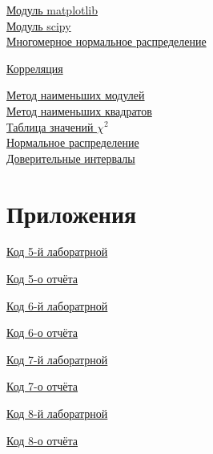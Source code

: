 \documentclass[a4]{article}
\begin{document}
	\href{https://matplotlib.org/}{Модуль matplotlib}\\
	
	\href{https://www.scipy.org/}{Модуль scipy}\\
	
	
	\href{https://ru.wikipedia.org/wiki/%D0%9C%D0%BD%D0%BE%D0%B3%D0%BE%D0%BC%D0%B5%D1%80%D0%BD%D0%BE%D0%B5_%D0%BD%D0%BE%D1%80%D0%BC%D0%B0%D0%BB%D1%8C%D0%BD%D0%BE%D0%B5_%D1%80%D0%B0%D1%81%D0%BF%D1%80%D0%B5%D0%B4%D0%B5%D0%BB%D0%B5%D0%BD%D0%B8%D0%B5}{Многомерное нормальное распределение}
	
	\href{https://ru.wikipedia.org/wiki/%D0%9A%D0%BE%D1%80%D1%80%D0%B5%D0%BB%D1%8F%D1%86%D0%B8%D1%8F}{Корреляция}
	
	\href{https://ru.wikipedia.org/wiki/%D0%9C%D0%B5%D1%82%D0%BE%D0%B4_%D0%BD%D0%B0%D0%B8%D0%BC%D0%B5%D0%BD%D1%8C%D1%88%D0%B8%D1%85_%D0%BC%D0%BE%D0%B4%D1%83%D0%BB%D0%B5%D0%B9}{Метод наименьших модулей}\\
		
	\href{https://ru.wikipedia.org/wiki/%D0%9C%D0%B5%D1%82%D0%BE%D0%B4_%D0%BD%D0%B0%D0%B8%D0%BC%D0%B5%D0%BD%D1%8C%D1%88%D0%B8%D1%85_%D0%BA%D0%B2%D0%B0%D0%B4%D1%80%D0%B0%D1%82%D0%BE%D0%B2}{Метод наименьших квадратов}\\
	
	\href{https://ru.wikipedia.org/wiki/%D0%9A%D0%B2%D0%B0%D0%BD%D1%82%D0%B8%D0%BB%D0%B8_%D1%80%D0%B0%D1%81%D0%BF%D1%80%D0%B5%D0%B4%D0%B5%D0%BB%D0%B5%D0%BD%D0%B8%D1%8F_%D1%85%D0%B8-%D0%BA%D0%B2%D0%B0%D0%B4%D1%80%D0%B0%D1%82}{Таблица значений $\chi^2$}\\
		
	\href{https://ru.wikipedia.org/wiki/%D0%9D%D0%BE%D1%80%D0%BC%D0%B0%D0%BB%D1%8C%D0%BD%D0%BE%D0%B5_%D1%80%D0%B0%D1%81%D0%BF%D1%80%D0%B5%D0%B4%D0%B5%D0%BB%D0%B5%D0%BD%D0%B8%D0%B5}{Нормальное распределение}\\
		
	\href{http://mit.spbau.ru/sewiki/images/a/a1/Cis.pdf}{Доверительные интервалы}\\
	
	\section{Приложения}
	
	\href{https://github.com/LuciusGen/Matstat/blob/master/Lab5/Lab5.py}{Код 5-й лаборатрной}
	
	\href{https://github.com/LuciusGen/Matstat/blob/master/Lab5/lab5.tex}{Код 5-о отчёта}
	
	\href{https://github.com/LuciusGen/Matstat/blob/master/Lab6/Lab6.py}{Код 6-й лаборатрной}
	
	\href{https://github.com/LuciusGen/Matstat/blob/master/Lab6/lab6.tex}{Код 6-о отчёта}
	
	\href{https://github.com/LuciusGen/Matstat/blob/master/Lab6/Lab7.py}{Код 7-й лаборатрной}
	
	\href{https://github.com/LuciusGen/Matstat/blob/master/Lab6/lab7.tex}{Код 7-о отчёта}
	
	\href{https://github.com/LuciusGen/Matstat/blob/master/Lab8/Lab8.py}{Код 8-й лаборатрной}
	
	\href{https://github.com/LuciusGen/Matstat/blob/master/Lab8/lab8.tex}{Код 8-о отчёта}
	
\end{document}

